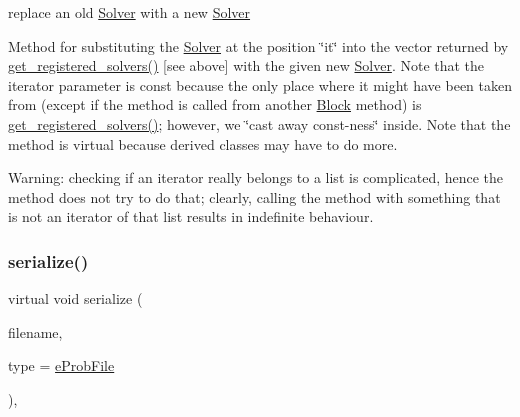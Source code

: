 replace an old \mbox{\hyperlink{class_s_m_spp__di__unipi__it_1_1_solver}{Solver}} with a new \mbox{\hyperlink{class_s_m_spp__di__unipi__it_1_1_solver}{Solver}} 

Method for substituting the \mbox{\hyperlink{class_s_m_spp__di__unipi__it_1_1_solver}{Solver}} at the position \char`\"{}it\char`\"{} into the vector returned by \mbox{\hyperlink{class_s_m_spp__di__unipi__it_1_1_block_a052e250efe81b0840361e70c520bdd7f}{get\+\_\+registered\+\_\+solvers()}} \mbox{[}see above\mbox{]} with the given new \mbox{\hyperlink{class_s_m_spp__di__unipi__it_1_1_solver}{Solver}}. Note that the iterator parameter is const because the only place where it might have been taken from (except if the method is called from another \mbox{\hyperlink{class_s_m_spp__di__unipi__it_1_1_block}{Block}} method) is \mbox{\hyperlink{class_s_m_spp__di__unipi__it_1_1_block_a052e250efe81b0840361e70c520bdd7f}{get\+\_\+registered\+\_\+solvers()}}; however, we \char`\"{}cast away
const-\/ness\char`\"{} inside. Note that the method is virtual because derived classes may have to do more.

Warning\+: checking if an iterator really belongs to a list is complicated, hence the method does not try to do that; clearly, calling the method with something that is not an iterator of that list results in indefinite behaviour. \mbox{\label{class_s_m_spp__di__unipi__it_1_1_block_a8209df4072912666c1ea5f6979c035fc}} 
\subsubsection{\texorpdfstring{serialize()}{serialize()}\hspace{0.1cm}{\footnotesize\ttfamily [1/3]}}
{\footnotesize\ttfamily virtual void serialize (\begin{DoxyParamCaption}\item[{const char $\ast$}]{filename,  }\item[{const int}]{type = {\ttfamily \mbox{\hyperlink{group___s_m_s__types_ggab8fe98d4e6a9961e16ab25006d6eebd8ab4763484df9e463c82bde775db014c10}{e\+Prob\+File}}} }\end{DoxyParamCaption})\hspace{0.3cm}{\ttfamily [inline]}, {\ttfamily [virtual]}}



